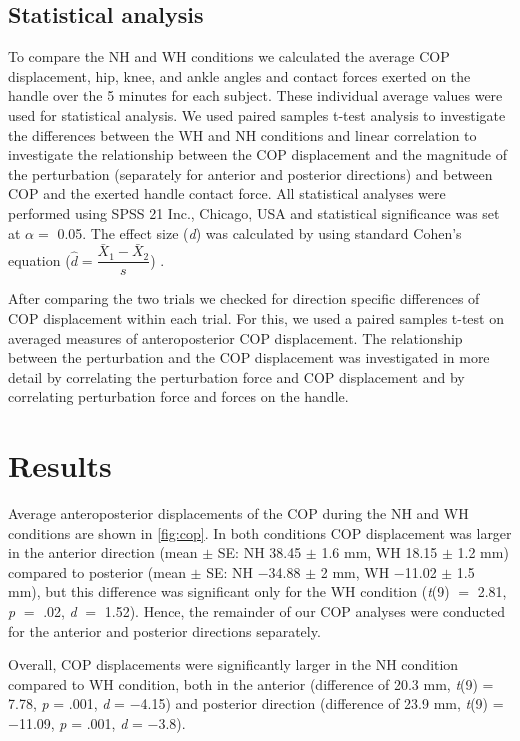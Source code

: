 \subsection{Statistical analysis}
To compare the NH and WH conditions we calculated the average COP displacement, hip, knee, and ankle angles and contact forces exerted on the handle over the 5 minutes for each subject. These individual average values were used for statistical analysis. 
We used paired samples t-test analysis to investigate the differences between the WH and NH conditions and linear correlation to investigate the relationship between the COP displacement and the magnitude of the perturbation (separately for anterior and posterior directions) and between COP and the exerted handle contact force. All statistical analyses were performed using SPSS 21 Inc., Chicago, USA and statistical significance was set at $\alpha =$ 0.05. The effect size (\textit{d}) was calculated by using standard Cohen’s equation ($\hat{d}=\dfrac{\bar{X}_{1} - \bar{X}_{2}}{s}$) \cite{Cohen1988}. 

After comparing the two trials we checked for direction specific differences of COP displacement within each trial. For this, we used a paired samples t-test on averaged measures of anteroposterior COP displacement. The relationship between the perturbation and the COP displacement was investigated in more detail by correlating the perturbation force and COP displacement and by correlating perturbation force and forces on the handle.

\section{Results}
Average anteroposterior displacements of the COP during the NH and WH conditions are shown in \FigureAbbr \ref{fig:cop}. In both conditions COP displacement was larger in the anterior direction (mean $\pm$ SE: NH 38.45 $\pm$ 1.6 mm,  WH 18.15 $\pm$ 1.2 mm) compared to posterior (mean $\pm$ SE: NH $-$34.88 $\pm$ 2 mm, WH $-$11.02 $\pm$ 1.5 mm), but this difference was significant only for the WH condition (\textit{t}(9) $=$ 2.81, \textit{p} $=$ .02, \textit{d} $=$ 1.52). Hence, the remainder of our COP analyses were conducted for the anterior and posterior directions separately. 

Overall, COP displacements were significantly larger in the NH condition compared to WH condition, both in the anterior (difference of 20.3 mm, \textit{t}(9) = 7.78, \textit{p} = .001, \textit{d} = $-$4.15) and posterior direction (difference of 23.9 mm, \textit{t}(9) = $-$11.09, \textit{p} = .001, \textit{d} = $-$3.8). 

